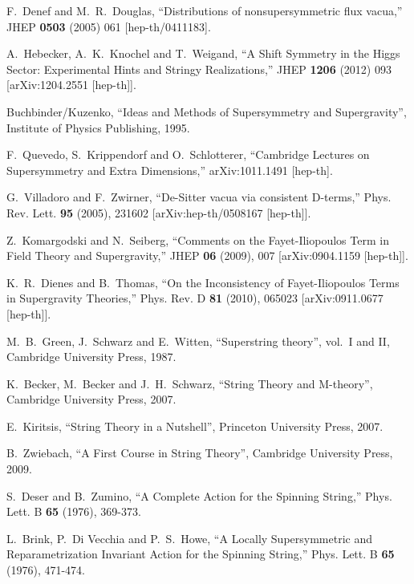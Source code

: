 \documentclass[12pt]{article}
\numberwithin{equation}{section}
\begin{document}
\begin{thebibliography}{999}
  F.~Denef and M.~R.~Douglas,
  ``Distributions of nonsupersymmetric flux vacua,''
  JHEP {\bf 0503} (2005) 061
  [hep-th/0411183].

  A.~Hebecker, A.~K.~Knochel and T.~Weigand,
  ``A Shift Symmetry in the Higgs Sector: Experimental Hints and Stringy
  Realizations,''
  JHEP {\bf 1206} (2012) 093 [arXiv:1204.2551 [hep-th]].

 Buchbinder/Kuzenko, ``Ideas and Methods of Supersymmetry and Supergravity'', Institute of Physics Publishing, 1995.

  F.~Quevedo, S.~Krippendorf and O.~Schlotterer,
  ``Cambridge Lectures on Supersymmetry and Extra Dimensions,''
  arXiv:1011.1491 [hep-th].
  
G.~Villadoro and F.~Zwirner,
``De-Sitter vacua via consistent D-terms,''
Phys. Rev. Lett. \textbf{95} (2005), 231602
[arXiv:hep-th/0508167 [hep-th]].

Z.~Komargodski and N.~Seiberg,
``Comments on the Fayet-Iliopoulos Term in Field Theory and Supergravity,''
JHEP \textbf{06} (2009), 007
[arXiv:0904.1159 [hep-th]].

K.~R.~Dienes and B.~Thomas,
``On the Inconsistency of Fayet-Iliopoulos Terms in Supergravity Theories,''
Phys. Rev. D \textbf{81} (2010), 065023
[arXiv:0911.0677 [hep-th]].

 M.~B.~Green, J.~Schwarz and E.~Witten, ``Superstring theory'', vol.~I and II, Cambridge University Press, 1987.

 K.~Becker, M.~Becker and J.~H.~Schwarz, ``String Theory and M-theory'', Cambridge University Press, 2007.

 E.~Kiritsis, ``String Theory in a Nutshell'', Princeton University Press, 2007.

 B.~Zwiebach, ``A First Course in String Theory'', Cambridge University Press, 2009.

S.~Deser and B.~Zumino,
``A Complete Action for the Spinning String,''
Phys. Lett. B \textbf{65} (1976), 369-373.

L.~Brink, P.~Di Vecchia and P.~S.~Howe,
``A Locally Supersymmetric and Reparametrization Invariant Action for the Spinning String,''
Phys. Lett. B \textbf{65} (1976), 471-474.


\end{thebibliography}
\end{document}
